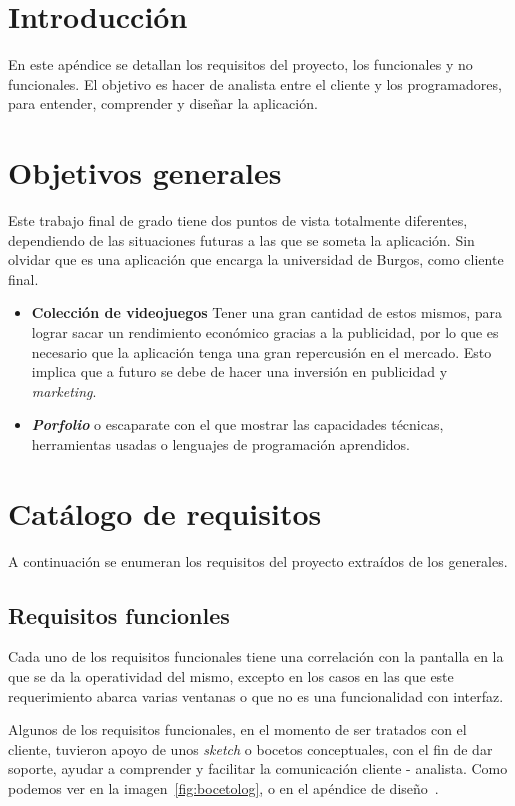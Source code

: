 
\section{Introducción}\label{requisitos}
En este apéndice se detallan los requisitos del proyecto, los funcionales y no funcionales. El objetivo es hacer de analista entre el cliente y los programadores, para entender, comprender y diseñar la aplicación. 

\section{Objetivos generales}
Este trabajo final de grado tiene dos puntos de vista totalmente diferentes, dependiendo de las situaciones futuras a las que se someta la aplicación. Sin olvidar que es una aplicación que encarga la universidad de Burgos, como cliente final.

\begin{itemize}
	\item \textbf{Colección de videojuegos} Tener una gran cantidad de estos mismos, para lograr sacar un rendimiento económico gracias a la publicidad, por lo que es necesario que la aplicación tenga una gran repercusión en el mercado. Esto implica que a futuro se debe de hacer una inversión en publicidad y \emph{marketing}.
	\item \textbf{\emph{Porfolio}} \cite{wiki:portafolio} o escaparate con el que mostrar las capacidades técnicas, herramientas usadas o lenguajes de programación aprendidos.
\end{itemize}

\section{Catálogo de requisitos}
A continuación se enumeran los requisitos del proyecto extraídos de los generales.

\subsection{Requisitos funcionles}
Cada uno de los requisitos funcionales tiene una correlación con la pantalla en la que se da la operatividad del mismo, excepto en los casos en las que este requerimiento abarca varias ventanas o que no es una funcionalidad con interfaz.

Algunos de los requisitos funcionales, en el momento de ser tratados con el cliente, tuvieron apoyo de unos \emph{sketch} o bocetos conceptuales, con el fin de dar soporte, ayudar a comprender y facilitar la comunicación cliente - analista. Como podemos ver en la imagen~\ref{fig:bocetolog}, o en el apéndice de diseño~\pageref{diseño}.

